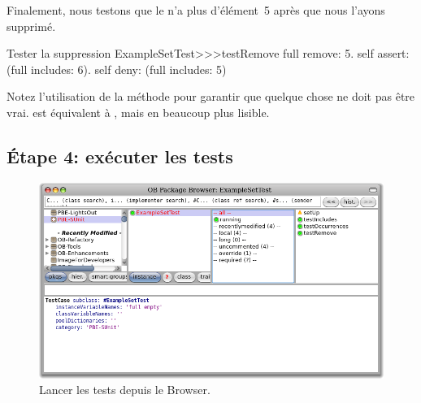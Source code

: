 \documentclass[a4paper,10pt,twoside]{book}
\begin{document}
Finalement, nous testons que le  n'a plus d'élément~5 après que nous l'ayons supprimé.

\begin{method}[testRemove]{Tester la suppression}
ExampleSetTest>>>testRemove
	full remove: 5.
	self assert: (full includes: 6).
	self deny: (full includes: 5)
\end{method}

\noindent
Notez l'utilisation de la méthode  pour garantir que quelque chose ne doit pas être vrai.
 est équivalent à , mais en beaucoup plus lisible.
\subsection{\'Etape 4: exécuter les tests}

\begin{figure}[tbh]
  \begin{center}
	\includegraphics[width=\linewidth]{browser-tests}
	\caption{Lancer les tests \sunit depuis le Browser.}
  \end{center}
\end{figure}
\end{document}
